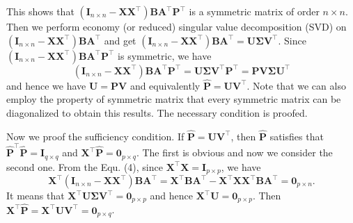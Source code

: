 \documentclass[titlepage,11pt,twoside]{article}
\begin{document}
This shows that $(\mathbf{I}_{n\times n}-\mathbf{X}\mathbf{X}^{\top})\mathbf{B}\mathbf{A}^{\top}\mathbf{P}^{\top}$ is a symmetric matrix of order $n\times n$. Then we perform economy (or reduced) singular value decomposition (SVD) on $(\mathbf{I}_{n\times n}-\mathbf{X}\mathbf{X}^{\top})\mathbf{B}\mathbf{A}^{\top}$ and get 
$(\mathbf{I}_{n\times n}-\mathbf{X}\mathbf{X}^{\top})\mathbf{B}\mathbf{A}^{\top}=\mathbf{U}\mathbf{\Sigma}\mathbf{V}^{\top}$.
Since $(\mathbf{I}_{n\times n}-\mathbf{X}\mathbf{X}^{\top})\mathbf{B}\mathbf{A}^{\top}\mathbf{P}^{\top}$ is symmetric, we have
\begin{equation}
(\mathbf{I}_{n\times n}-\mathbf{X}\mathbf{X}^{\top})\mathbf{B}\mathbf{A}^{\top}\mathbf{P}^{\top}
=
\mathbf{U}\mathbf{\Sigma}\mathbf{V}^{\top}\mathbf{P}^{\top}
=
\mathbf{P}\mathbf{V}\mathbf{\Sigma}\mathbf{U}^{\top}
\end{equation}
and hence we have $\mathbf{U}=\mathbf{P}\mathbf{V}$ and equivalently $\mathbf{\hat{P}}=\mathbf{U}\mathbf{V}^{\top}$. Note that we can also employ the property of symmetric matrix that every symmetric matrix can be diagonalized to obtain this results. The necessary condition is proofed. 

Now we proof the sufficiency condition. If $\mathbf{\hat{P}}=\mathbf{U}\mathbf{V}^{\top}$, then $\mathbf{\hat{P}}$ satisfies that $\mathbf{\hat{P}}^{\top}\mathbf{\hat{P}}=\mathbf{I}_{q\times q}$ and $\mathbf{X}^{\top}\mathbf{\hat{P}}=\mathbf{0}_{p\times q}$. The first is obvious and now we consider the second one. From the Equ. (4), since $\mathbf{X}^{\top}\mathbf{X}=\mathbf{I}_{p\times p}$, we have  
\begin{equation}
\mathbf{X}^{\top}(\mathbf{I}_{n\times n}-\mathbf{X}\mathbf{X}^{\top})\mathbf{B}\mathbf{A}^{\top}=\mathbf{X}^{\top}\mathbf{B}\mathbf{A}^{\top}-\mathbf{X}^{\top}\mathbf{X}\mathbf{X}^{\top}\mathbf{B}\mathbf{A}^{\top}
=
\mathbf{0}_{p\times n}
.
\end{equation}
It means that $\mathbf{X}^{\top}\mathbf{U}\mathbf{\Sigma}\mathbf{V}^{\top}=\mathbf{0}_{p\times p}$ and hence $\mathbf{X}^{\top}\mathbf{U}=\mathbf{0}_{p\times p}$. Then $\mathbf{X}^{\top}\mathbf{\hat{P}}=\mathbf{X}^{\top}\mathbf{U}\mathbf{V}^{\top}=\mathbf{0}_{p\times q}$.
\end{document}
